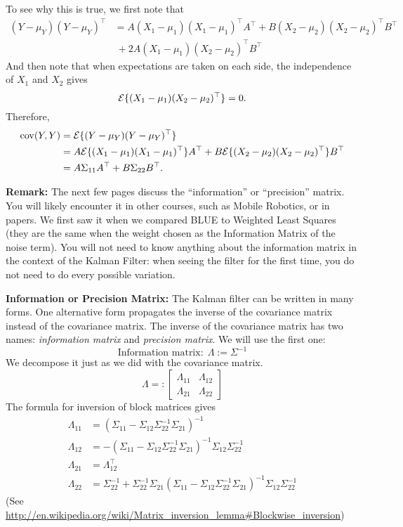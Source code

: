 \documentclass[letterpaper]{article}
\newcommand{\cov}{\mathrm{cov}}
\begin{document}
 To see why this is true, we first note that
\begin{align*}(Y-\mu_Y)(Y-\mu_Y)^\top &= A (X_1-\mu_1)(X_1-\mu_1)^\top A^\top +  B (X_2-\mu_2)(X_2-\mu_2)^\top B^\top \\
&~ + 2 A (X_1-\mu_1)(X_2-\mu_2)^\top B^\top
\end{align*}
And then note that when expectations are taken on each side, the independence of $X_1$ and $X_2$ gives
$${\cal E}\{ (X_1-\mu_1)(X_2-\mu_2)^\top \}=0.$$
Therefore,
\begin{align*}
\cov(Y,Y) &= {\cal E} \{(Y-\mu_Y)(Y-\mu_Y)^\top  \}\\
&= A  {\cal E }\{ (X_1-\mu_1)(X_1-\mu_1)^\top \} A^\top +  B {\cal E}\{  (X_2-\mu_2)(X_2-\mu_2)^\top \} B^\top \\
&= A\Sigma_{11} A^\top + B \Sigma_{22} B^\top.
\end{align*}

\vspace*{3cm}
\textbf{Remark:} The next few pages discuss the ``information'' or ``precision'' matrix. You will likely encounter it in other courses, such as Mobile Robotics, or in papers. We first saw it when we compared BLUE to Weighted Least Squares (they are the same when the weight chosen as the Information Matrix of the noise term). You will not need to know anything about the information matrix in the context of the Kalman Filter: when seeing the filter for the first time, you do not need to do every possible variation.

 \newpage

 \noindent \textbf{Information or Precision Matrix:}  The Kalman filter can be written in many forms. One alternative form propagates the inverse of the covariance matrix instead of the covariance matrix. The inverse of the covariance matrix has two names: \textit{information matrix} and \textit{precision matrix}. We will use the first one:
 $$\text{Information matrix:}~~ \Lambda := \Sigma^{-1}$$
 We decompose it just as we did with the covariance matrix.
 $$ \Lambda =: \left[ \begin{array}{cc} \Lambda_{11} & \Lambda_{12} \\ \Lambda_{21} & \Lambda_{22} \end{array}  \right]$$
 The formula for inversion of block matrices gives
\begin{align*}
\Lambda_{11}&=(\Sigma_{11}-\Sigma_{12} \Sigma_{22}^{-1}\Sigma_{21})^{-1}\\
\Lambda_{12}&=-(\Sigma_{11}-\Sigma_{12} \Sigma_{22}^{-1}\Sigma_{21})^{-1} \Sigma_{12} \Sigma_{22}^{-1}\\
\Lambda_{21}&=\Lambda_{12}^\top \\
\Lambda_{22}&=\Sigma_{22}^{-1} + \Sigma_{22}^{-1} \Sigma_{21}
(\Sigma_{11}-\Sigma_{12} \Sigma_{22}^{-1}\Sigma_{21})^{-1} \Sigma_{12} \Sigma_{22}^{-1}
\end{align*}
(See { \small \url{http://en.wikipedia.org/wiki/Matrix_inversion_lemma#Blockwise_inversion}})\\
\end{document}
